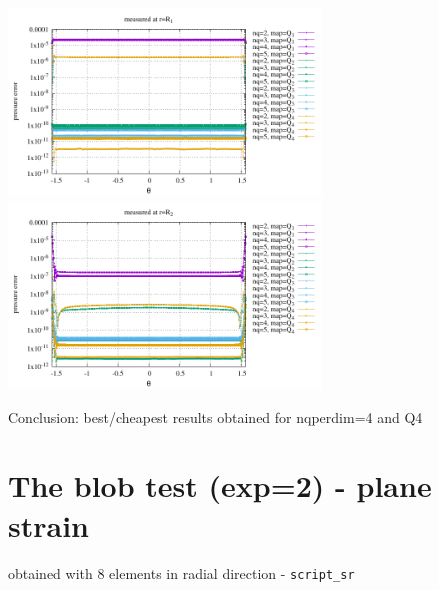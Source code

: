\begin{center}
\includegraphics[width=8.3cm]{python_codes/fieldstone_152/results/exp1_axisymmetric/qqq_R1}
\includegraphics[width=8.3cm]{python_codes/fieldstone_152/results/exp1_axisymmetric/qqq_R2}
\end{center}

Conclusion: best/cheapest results obtained for nqperdim=4 and Q4



\newpage
\section*{The blob test (exp=2) - plane strain}

obtained with 8 elements in radial direction - {\tt script\_sr}

